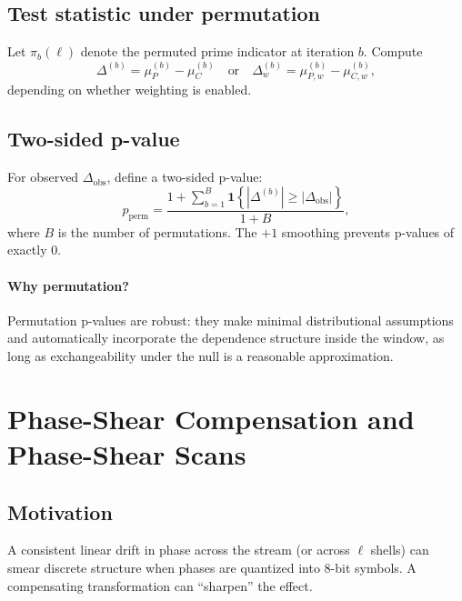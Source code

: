\documentclass[11pt,a4paper]{article}
\begin{document}
\subsection{Test statistic under permutation}
Let $\pi_b(\ell)$ denote the permuted prime indicator at iteration $b$.
Compute
\begin{equation}
\Delta^{(b)} =
\mu_{P}^{(b)} - \mu_{C}^{(b)}
\quad \text{or} \quad
\Delta_w^{(b)}=\mu_{P,w}^{(b)}-\mu_{C,w}^{(b)},
\end{equation}
depending on whether weighting is enabled.

\subsection{Two-sided p-value}
For observed $\Delta_{\mathrm{obs}}$, define a two-sided p-value:
\begin{equation}
p_{\mathrm{perm}}=
\frac{1+\sum_{b=1}^{B} \mathbf{1}\left\{|\Delta^{(b)}|\ge|\Delta_{\mathrm{obs}}|\right\}}
{1+B},
\end{equation}
where $B$ is the number of permutations.
The $+1$ smoothing prevents p-values of exactly 0.

\paragraph{Why permutation?}
Permutation p-values are robust: they make minimal distributional assumptions and
automatically incorporate the dependence structure inside the window, as long as
exchangeability under the null is a reasonable approximation.

\section{Phase-Shear Compensation and Phase-Shear Scans}

\subsection{Motivation}
A consistent linear drift in phase across the stream (or across $\ell$ shells)
can smear discrete structure when phases are quantized into 8-bit symbols.
A compensating transformation can ``sharpen'' the effect.
\end{document}
